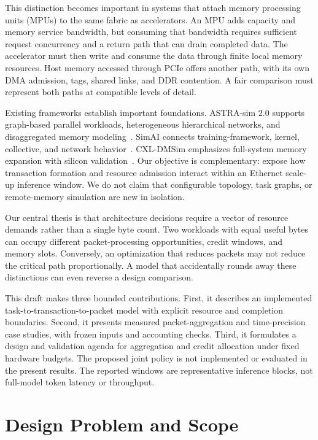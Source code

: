 \documentclass[conference]{IEEEtran}
\begin{document}
This distinction becomes important in systems that attach memory processing units (MPUs) to the same fabric as accelerators. An MPU adds capacity and memory service bandwidth, but consuming that bandwidth requires sufficient request concurrency and a return path that can drain completed data. The accelerator must then write and consume the data through finite local memory resources. Host memory accessed through PCIe offers another path, with its own DMA admission, tags, shared links, and DDR contention. A fair comparison must represent both paths at compatible levels of detail.

Existing frameworks establish important foundations. ASTRA-sim 2.0 supports graph-based parallel workloads, heterogeneous hierarchical networks, and disaggregated memory modeling~\cite{astra2}. SimAI connects training-framework, kernel, collective, and network behavior~\cite{simai}. CXL-DMSim emphasizes full-system memory expansion with silicon validation~\cite{cxldmsim}. Our objective is complementary: expose how transaction formation and resource admission interact within an Ethernet scale-up inference window. We do not claim that configurable topology, task graphs, or remote-memory simulation are new in isolation.

Our central thesis is that architecture decisions require a vector of resource demands rather than a single byte count. Two workloads with equal useful bytes can occupy different packet-processing opportunities, credit windows, and memory slots. Conversely, an optimization that reduces packets may not reduce the critical path proportionally. A model that accidentally rounds away these distinctions can even reverse a design comparison.

This draft makes three bounded contributions. First, it describes an implemented task-to-transaction-to-packet model with explicit resource and completion boundaries. Second, it presents measured packet-aggregation and time-precision case studies, with frozen inputs and accounting checks. Third, it formulates a design and validation agenda for aggregation and credit allocation under fixed hardware budgets. The proposed joint policy is not implemented or evaluated in the present results. The reported windows are representative inference blocks, not full-model token latency or throughput.

\section{Design Problem and Scope}
\end{document}
